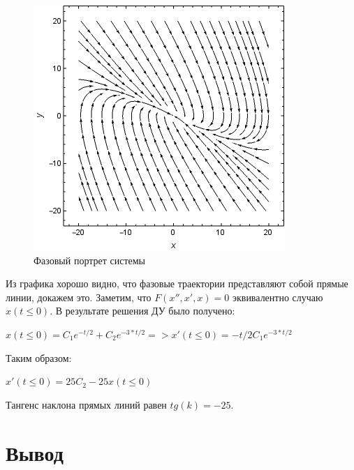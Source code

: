 \documentclass[14pt,a4paper,report]{report}
\begin{document}
\begin{figure}[h!]
	\centering
	\includegraphics[scale = 1]{images/download.png}
	\caption{Фазовый портрет системы}
	\label{image:9}
\end{figure}

Из графика хорошо видно, что фазовые траектории представляют собой прямые линии, докажем это. Заметим, что $F(x'',x',x)=0$ эквивалентно случаю $x(t\leq0)$. В результате решения ДУ было получено:

$x(t\leq0)=C_1e^{-t/2}+C_2e^{-3*t/2} => x'(t\leq0)=-t/2C_1e^{-3*t/2}$

Таким образом:

$x'(t\leq0)=25C_2-25x(t\leq0)$

Тангенс наклона прямых линий равен $tg(k)=-25$.






\section{Вывод}
\end{document}
